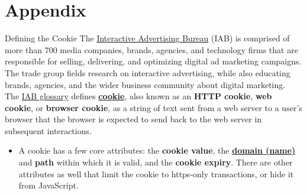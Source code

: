 \documentclass[pdf]{beamer}
\newcommand{\empr}[1]{{\color{franklinblue}\textbf{#1}}}
\theoremstyle{remark}
\theoremstyle{definition}
\begin{document}
\section{Appendix}

\begin{frame}[t]{Defining the Cookie}
The \href{https://www.iab.com/}{Interactive Advertising Bureau} (IAB) is comprised of more than 700  media companies, brands, agencies, and technology firms that are responsible for selling, delivering, and optimizing digital ad marketing campaigns.  The trade group fields research on interactive advertising, while also educating brands, agencies, and the wider business community about digital marketing. \\
\vspace{1.5ex}
The \href{https://www.iab.com/insights/glossary-of-terminology/}{IAB glossary} defines \href{https://www.iab.com/insights/glossary-of-terminology/\#index-3}{\empr{cookie}}, also known as an \empr{HTTP cookie}, \empr{web cookie}, or \empr{browser cookie}, as a string of text sent from a web server to a user's browser that the browser is expected to send back to the web server in subsequent interactions.\\
\vspace{1.5ex}
\small
\begin{itemize}
\item A cookie has a few core attributes: the \empr{cookie value}, the \href{https://www.iab.com/insights/glossary-of-terminology/\#index-4}{\empr{domain (name)}} and \empr{path} within which it is valid, and the \empr{cookie expiry}. There are other attributes as well that limit the cookie to https-only transactions, or hide it from JavaScript. 
\end{itemize}
\end{frame}
\end{document}
